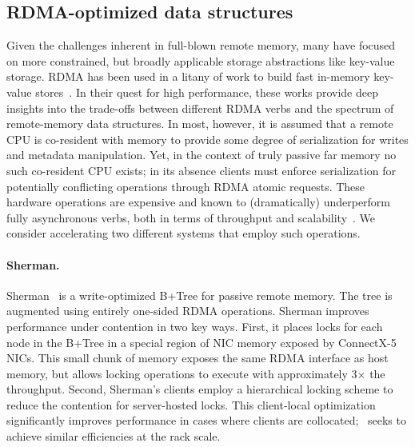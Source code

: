 \subsection{RDMA-optimized data structures}

Given the challenges inherent in full-blown remote memory, many have
focused on more constrained, but broadly applicable storage
abstractions like key-value storage.  RDMA has been used in a litany
of work to build fast in-memory key-value
stores~\cite{farm,MemC3,herd,pilaf,sonuma,storm}. In their quest for
high performance, these works provide deep insights into the
trade-offs between different RDMA verbs and the spectrum of
remote-memory data structures. In most, however, it is assumed that a
remote CPU is co-resident with memory to provide some degree of
serialization for writes and metadata manipulation. Yet, in the
context of truly passive far memory no such co-resident CPU exists;
in its absence clients must enforce serialization for potentially
conflicting operations through RDMA atomic requests. These
hardware operations are expensive and known to (dramatically)
underperform fully asynchronous verbs, both in terms of throughput and
scalability~\cite{design-guidelines}.  We consider accelerating two
different systems that employ such operations.

\paragraph{Sherman.}

Sherman~\cite{sherman} is a write-optimized B+Tree for passive remote memory. The
tree is augmented using entirely one-sided RDMA operations. Sherman
improves performance under contention in two key ways. First, it
places locks for each node in the B+Tree in a special region of NIC
memory exposed by ConnectX-5 NICs.  This small chunk of memory exposes
the same RDMA interface as host memory, but allows locking operations
to execute with approximately 3$\times$ the throughput.  Second,
Sherman's clients employ a hierarchical locking scheme to reduce the
contention for server-hosted locks.  This client-local optimization
significantly improves performance in cases where clients are
collocated; \sword\ seeks to achieve similar efficiencies at the rack
scale.




